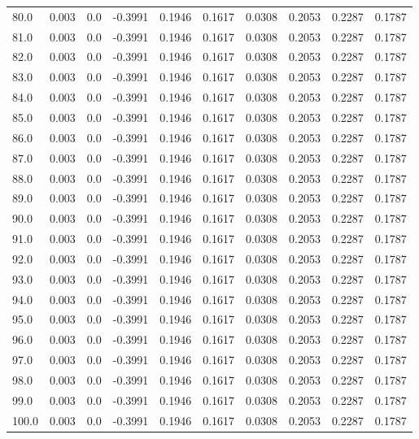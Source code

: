 \begin{longtable}{lrrrrrrrrr}
80.0 & 0.003 & 0.0 & -0.3991 & 0.1946 & 0.1617 & 0.0308 & 0.2053 & 0.2287 & 0.1787 \\
81.0 & 0.003 & 0.0 & -0.3991 & 0.1946 & 0.1617 & 0.0308 & 0.2053 & 0.2287 & 0.1787 \\
82.0 & 0.003 & 0.0 & -0.3991 & 0.1946 & 0.1617 & 0.0308 & 0.2053 & 0.2287 & 0.1787 \\
83.0 & 0.003 & 0.0 & -0.3991 & 0.1946 & 0.1617 & 0.0308 & 0.2053 & 0.2287 & 0.1787 \\
84.0 & 0.003 & 0.0 & -0.3991 & 0.1946 & 0.1617 & 0.0308 & 0.2053 & 0.2287 & 0.1787 \\
85.0 & 0.003 & 0.0 & -0.3991 & 0.1946 & 0.1617 & 0.0308 & 0.2053 & 0.2287 & 0.1787 \\
86.0 & 0.003 & 0.0 & -0.3991 & 0.1946 & 0.1617 & 0.0308 & 0.2053 & 0.2287 & 0.1787 \\
87.0 & 0.003 & 0.0 & -0.3991 & 0.1946 & 0.1617 & 0.0308 & 0.2053 & 0.2287 & 0.1787 \\
88.0 & 0.003 & 0.0 & -0.3991 & 0.1946 & 0.1617 & 0.0308 & 0.2053 & 0.2287 & 0.1787 \\
89.0 & 0.003 & 0.0 & -0.3991 & 0.1946 & 0.1617 & 0.0308 & 0.2053 & 0.2287 & 0.1787 \\
90.0 & 0.003 & 0.0 & -0.3991 & 0.1946 & 0.1617 & 0.0308 & 0.2053 & 0.2287 & 0.1787 \\
91.0 & 0.003 & 0.0 & -0.3991 & 0.1946 & 0.1617 & 0.0308 & 0.2053 & 0.2287 & 0.1787 \\
92.0 & 0.003 & 0.0 & -0.3991 & 0.1946 & 0.1617 & 0.0308 & 0.2053 & 0.2287 & 0.1787 \\
93.0 & 0.003 & 0.0 & -0.3991 & 0.1946 & 0.1617 & 0.0308 & 0.2053 & 0.2287 & 0.1787 \\
94.0 & 0.003 & 0.0 & -0.3991 & 0.1946 & 0.1617 & 0.0308 & 0.2053 & 0.2287 & 0.1787 \\
95.0 & 0.003 & 0.0 & -0.3991 & 0.1946 & 0.1617 & 0.0308 & 0.2053 & 0.2287 & 0.1787 \\
96.0 & 0.003 & 0.0 & -0.3991 & 0.1946 & 0.1617 & 0.0308 & 0.2053 & 0.2287 & 0.1787 \\
97.0 & 0.003 & 0.0 & -0.3991 & 0.1946 & 0.1617 & 0.0308 & 0.2053 & 0.2287 & 0.1787 \\
98.0 & 0.003 & 0.0 & -0.3991 & 0.1946 & 0.1617 & 0.0308 & 0.2053 & 0.2287 & 0.1787 \\
99.0 & 0.003 & 0.0 & -0.3991 & 0.1946 & 0.1617 & 0.0308 & 0.2053 & 0.2287 & 0.1787 \\
100.0 & 0.003 & 0.0 & -0.3991 & 0.1946 & 0.1617 & 0.0308 & 0.2053 & 0.2287 & 0.1787 \\

\end{longtable}
